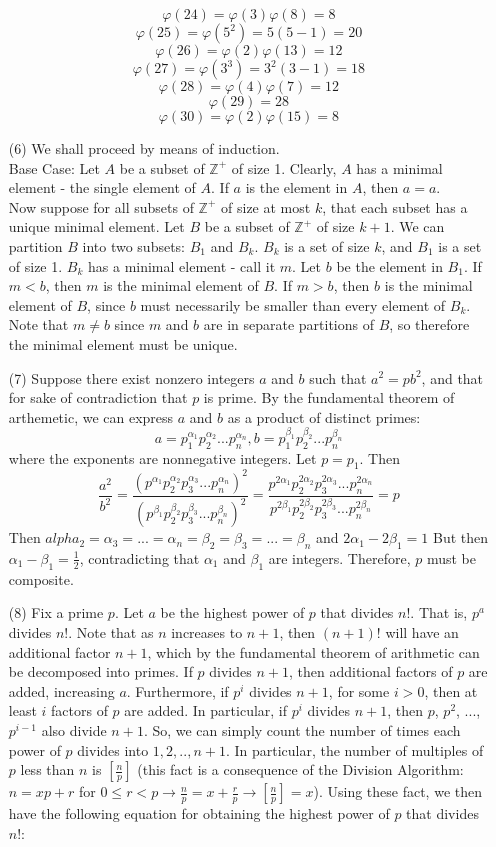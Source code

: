 \documentclass[12pt]{article}
\begin{document}
\begin{itemize}
$$\varphi(24) = \varphi(3)\varphi(8) = 8$$
$$\varphi(25) = \varphi(5^2) = 5(5 - 1) = 20$$
$$\varphi(26) = \varphi(2)\varphi(13) = 12$$
$$\varphi(27) = \varphi(3^3) = 3^2(3 - 1) = 18$$
$$\varphi(28) = \varphi(4)\varphi(7) = 12$$
$$\varphi(29) = 28$$
$$\varphi(30) = \varphi(2)\varphi(15) = 8$$
\item[(6)] We shall proceed by means of induction. \\
Base Case: Let $A$ be a subset of $\mathbb{Z}^+$ of size 1. Clearly, $A$ has a minimal element - the single element of $A$. If $a$ is the element in $A$, then $a = a$. \\
Now suppose for all subsets of $\mathbb{Z}^+$ of size at most $k$, that each subset has a unique minimal element. Let $B$ be a subset of $\mathbb{Z}^+$ of size $k + 1$. We can partition $B$ into two subsets: $B_1$ and $B_k$. $B_k$ is a set of size $k$, and $B_1$ is a set of size 1. $B_k$ has a minimal element - call it $m$. Let $b$ be the element in $B_1$. If $m < b$, then $m$ is the minimal element of $B$. If $m > b$, then $b$ is the minimal element of $B$, since $b$ must necessarily be smaller than every element of $B_k$. Note that $m \neq b$ since $m$ and $b$ are in separate partitions of $B$, so therefore the minimal element must be unique.
\item[(7)] Suppose there exist nonzero integers $a$ and $b$ such that $a^2 = pb^2$, and that for sake of contradiction that $p$ is prime. By the fundamental theorem of arthemetic, we can express $a$ and $b$ as a product of distinct primes:
$$a = p_1^{\alpha_1}p_2^{\alpha_2}...p_n^{\alpha_n}, b = p_1^{\beta_1}p_2^{\beta_2}...p_n^{\beta_n}$$
where the exponents are nonnegative integers. Let $p = p_1$. Then
$$\frac{a^2}{b^2} = \frac{\left(p^{\alpha_1}p_2^{\alpha_2}p_3^{\alpha_3}...p_n^{\alpha_n} \right)^2}{\left(p^{\beta_1}p_2^{\beta_2}p_3^{\beta_3}...p_n^{\beta_n} \right)^2} = \frac{p^{2\alpha_1}p_2^{2\alpha_2}p_3^{2\alpha_3}...p_n^{2\alpha_n}}{p^{2\beta_1}p_2^{2\beta_2}p_3^{2\beta_3}...p_n^{2\beta_n}} = p$$
Then $alpha_2 = \alpha_3 = ... = \alpha_n = \beta_2 = \beta_3 = ... = \beta_n$ and $2\alpha_1 - 2\beta_1 = 1$ But then $\alpha_1 - \beta_1 = \frac{1}{2}$, contradicting that $\alpha_1$ and $\beta_1$ are integers. Therefore, $p$ must be composite.
\item[(8)]
Fix a prime $p$. Let $a$ be the highest power of $p$ that divides $n!$. That is, $p^a$ divides $n!$. Note that as $n$ increases to $n+1$, then $(n+1)!$ will have an additional factor $n+1$, which by the fundamental theorem of arithmetic can be decomposed into primes. If $p$ divides $n+1$, then additional factors of $p$ are added, increasing $a$. Furthermore, if $p^i$ divides $n+1$, for some $i > 0$, then at least $i$ factors of $p$ are added. In particular, if $p^i$ divides $n+1$, then $p$, $p^2$, ..., $p^{i-1}$ also divide $n+1$. So, we can simply count the number of times each power of $p$ divides into $1, 2, .., n+1$. In particular, the number of multiples of $p$ less than $n$ is $\left[ \frac{n}{p} \right]$ (this fact is a consequence of the Division Algorithm: $n = xp + r$ for $0 \leq r < p \rightarrow \frac{n}{p} = x + \frac{r}{p} \rightarrow \left[ \frac{n}{p} \right] = x$). Using these fact, we then have the following equation for obtaining the highest power of $p$ that divides $n!$:

\end{itemize}
\end{document}
